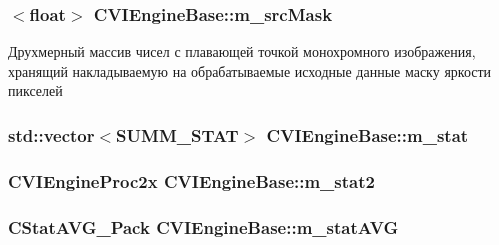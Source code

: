 \hypertarget{class_c_v_i_engine_base_a0b3b91816e3f19ec5e531c5ad903be98}{
\subsubsection[{m\+\_\+src\+Mask}]{$<$float$>$ C\+V\+I\+Engine\+Base\+::m\+\_\+src\+Mask}}\label{class_c_v_i_engine_base_a0b3b91816e3f19ec5e531c5ad903be98}


Друхмерный массив чисел с плавающей точкой монохромного изображения, хранящий накладываемую на обрабатываемые исходные данные маску яркости пикселей 

\hypertarget{class_c_v_i_engine_base_a73ff2aaa9eeb589ce6ea73ef5dd62fda}{
\subsubsection[{m\+\_\+stat}]{\setlength{\rightskip}{0pt plus 5cm}std\+::vector$<${\bf S\+U\+M\+M\+\_\+\+S\+T\+A\+T}$>$ C\+V\+I\+Engine\+Base\+::m\+\_\+stat}}\label{class_c_v_i_engine_base_a73ff2aaa9eeb589ce6ea73ef5dd62fda}




\hypertarget{class_c_v_i_engine_base_a91282745c78c776f8922e20c4f3198f5}{
\subsubsection[{m\+\_\+stat2}]{\setlength{\rightskip}{0pt plus 5cm}C\+V\+I\+Engine\+Proc2x C\+V\+I\+Engine\+Base\+::m\+\_\+stat2}}\label{class_c_v_i_engine_base_a91282745c78c776f8922e20c4f3198f5}




\hypertarget{class_c_v_i_engine_base_aad8ff35fe2bc6a8d6da03b8f93ea3341}{
\subsubsection[{m\+\_\+stat\+A\+V\+G}]{\setlength{\rightskip}{0pt plus 5cm}C\+Stat\+A\+V\+G\+\_\+\+Pack C\+V\+I\+Engine\+Base\+::m\+\_\+stat\+A\+V\+G}}\label{class_c_v_i_engine_base_aad8ff35fe2bc6a8d6da03b8f93ea3341}




